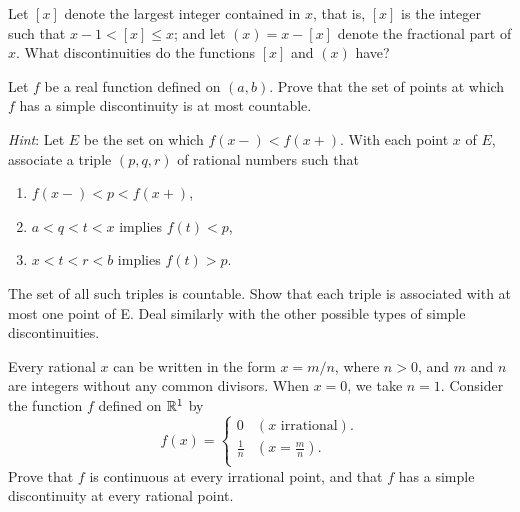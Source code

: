 \begin{myExercise}
    \label{ex:4.16}
    Let $[x]$ denote the largest integer contained in $x$, 
    that is, $[x]$ is the integer such that $x - 1 < [x] \leq x$; 
    and let $(x) = x - [x]$ denote the fractional part of $x$. 
    What discontinuities do the functions $[x]$ and $(x)$ have?
\end{myExercise}


\begin{myExercise}
    \label{ex:4.17}
    Let $f$ be a real function defined on $(a, b)$. 
    Prove that the set of points at which $f$ has a simple discontinuity is at most countable. 
    
    \emph{Hint}: Let $E$ be the set on which $f(x-) <f(x+ )$. 
    With each point $x$ of $E$, associate a triple $(p, q, r)$ of rational numbers such that 
    \begin{enumerate}
        \item $f(x-) < p <f(x+ )$,
        \item $a < q < t < x$ implies $f(t) < p$,
        \item $x < t < r < b$ implies $f(t) > p$.
    \end{enumerate} 
    The set of all such triples is countable. 
    Show that each triple is associated with at most one point of E. Deal similarly with the other possible types of simple discontinuities.
\end{myExercise}


\begin{myExercise}
    \label{ex:4.18}
    Every rational $x$ can be written in the form $x = m/n$, 
    where $n > 0$, and $m$ and $n$ are integers without any common divisors. 
    When $x = 0$, we take $n = 1$. 
    Consider the function $f$ defined on ${\protect\mathbb R}^1$ by 
    \begin{equation*}
        f(x) = \left\{ 
            \begin{array}{ll}
                0 & (x \text{ irrational}). \\
                \frac{1}{n} & \left( x = \frac{m}{n} \right) .\\
            \end{array}
        \right.
    \end{equation*} 
    Prove that $f$ is continuous at every irrational point, 
    and that $f$ has a simple discontinuity at every rational point.
\end{myExercise}